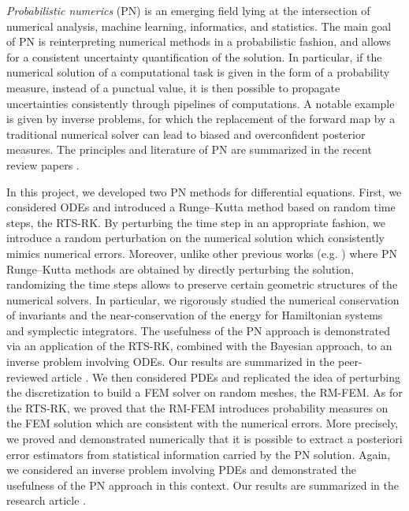 \documentclass[10pt]{article}
\begin{document}
\textit{Probabilistic numerics} (PN) is an emerging field lying at the intersection of numerical analysis, machine learning, informatics, and statistics. The main goal of PN is reinterpreting numerical methods in a probabilistic fashion, and allows for a consistent uncertainty quantification of the solution. In particular, if the numerical solution of a computational task is given in the form of a probability measure, instead of a punctual value, it is then possible to propagate uncertainties consistently through pipelines of computations. A notable example is given by inverse problems, for which the replacement of the forward map by a traditional numerical solver can lead to biased and overconfident posterior measures. The principles and literature of PN are summarized in the recent review papers \cite{COS19,HOG15,OaS19}.

In this project, we developed two PN methods for differential equations. First, we considered ODEs and introduced a Runge--Kutta method based on random time steps, the RTS-RK. By perturbing the time step in an appropriate fashion, we introduce a random perturbation on the numerical solution which consistently mimics numerical errors. Moreover, unlike other previous works (e.g. \cite{CGS17}) where PN Runge--Kutta methods are obtained by directly perturbing the solution, randomizing the time steps allows to preserve certain geometric structures of the numerical solvers. In particular, we rigorously studied the numerical conservation of invariants and the near-conservation of the energy for Hamiltonian systems and symplectic integrators. The usefulness of the PN approach is demonstrated via an application of the RTS-RK, combined with the Bayesian approach, to an inverse problem involving ODEs. Our results are summarized in the peer-reviewed article \cite{AbG20}. We then considered PDEs and replicated the idea of perturbing the discretization to build a FEM solver on random meshes, the RM-FEM. As for the RTS-RK, we proved that the RM-FEM introduces probability measures on the FEM solution which are consistent with the numerical errors. More precisely, we proved and demonstrated numerically that it is possible to extract a posteriori error estimators from statistical information carried by the PN solution. Again, we considered an inverse problem involving PDEs and demonstrated the usefulness of the PN approach in this context. Our results are summarized in the research article \cite{AbG21}.
\end{document}
